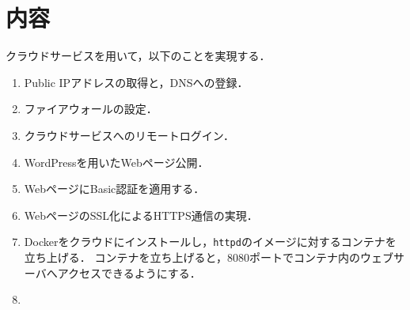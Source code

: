 \section{内容}
クラウドサービスを用いて，以下のことを実現する．
\begin{multicols}{2}
    \begin{enumerate}
        \renewcommand{\labelenumi}{\theenumi.\ }
        \item Public IPアドレスの取得と，DNSへの登録．
        \item ファイアウォールの設定．
        \item クラウドサービスへのリモートログイン．
        \item WordPressを用いたWebページ公開．
        \item WebページにBasic認証を適用する．
        \item WebページのSSL化によるHTTPS通信の実現．
              \columnbreak
        \item Dockerをクラウドにインストールし，\texttt{httpd}のイメージに対するコンテナを立ち上げる．
              コンテナを立ち上げると，8080ポートでコンテナ内のウェブサーバへアクセスできるようにする．
    \end{enumerate}
\end{multicols}
\begin{enumerate}
    \setcounter{enumi}{7}
    \renewcommand{\labelenumi}{\theenumi.\ }
    \item
\end{enumerate}